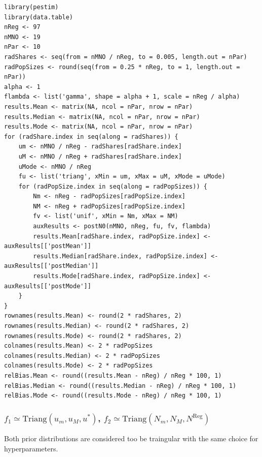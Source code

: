 \documentclass[12pt, a4paper]{article}
\begin{document}
\begin{verbatim}
library(pestim)
library(data.table)
nReg <- 97
nMNO <- 19
nPar <- 10
radShares <- seq(from = nMNO / nReg, to = 0.005, length.out = nPar)
radPopSizes <- round(seq(from = 0.25 * nReg, to = 1, length.out = nPar))
alpha <- 1
flambda <- list('gamma', shape = alpha + 1, scale = nReg / alpha)
results.Mean <- matrix(NA, ncol = nPar, nrow = nPar)
results.Median <- matrix(NA, ncol = nPar, nrow = nPar)
results.Mode <- matrix(NA, ncol = nPar, nrow = nPar)
for (radShare.index in seq(along = radShares)) {
    um <- nMNO / nReg - radShares[radShare.index]
    uM <- nMNO / nReg + radShares[radShare.index]
    uMode <- nMNO / nReg
    fu <- list('triang', xMin = um, xMax = uM, xMode = uMode)
    for (radPopSize.index in seq(along = radPopSizes)) {
        Nm <- nReg - radPopSizes[radPopSize.index]
        NM <- nReg + radPopSizes[radPopSize.index]
        fv <- list('unif', xMin = Nm, xMax = NM)
        auxResults <- postN0(nMNO, nReg, fu, fv, flambda)
        results.Mean[radShare.index, radPopSize.index] <- auxResults[['postMean']] 
        results.Median[radShare.index, radPopSize.index] <- auxResults[['postMedian']]
        results.Mode[radShare.index, radPopSize.index] <- auxResults[['postMode']]
    }
}
rownames(results.Mean) <- round(2 * radShares, 2)
rownames(results.Median) <- round(2 * radShares, 2)
rownames(results.Mode) <- round(2 * radShares, 2)
colnames(results.Mean) <- 2 * radPopSizes
colnames(results.Median) <- 2 * radPopSizes
colnames(results.Mode) <- 2 * radPopSizes
relBias.Mean <- round((results.Mean - nReg) / nReg * 100, 1)
relBias.Median <- round((results.Median - nReg) / nReg * 100, 1)
relBias.Mode <- round((results.Mode - nReg) / nReg * 100, 1)
\end{verbatim}


\subsubsection{$f_{1}\simeq\textrm{Triang}(u_{m}, u_{M}, u^{*})$, $f_{2}\simeq\textrm{Triang}(N_{m}, N_{M}, N^{\textrm{Reg}})$}

Both prior distributions are considered too be traingular with the same choice for hyperparameters.
\end{document}

